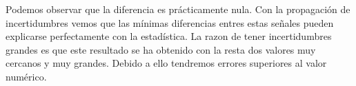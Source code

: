 Podemos observar que la diferencia es prácticamente nula. Con la propagación de incertidumbres vemos que las mínimas diferencias entres estas señales pueden explicarse perfectamente con la estadística. La razon de tener incertidumbres grandes es que este resultado se ha obtenido con la resta dos valores muy cercanos y muy grandes. Debido a ello tendremos errores superiores al valor numérico.



